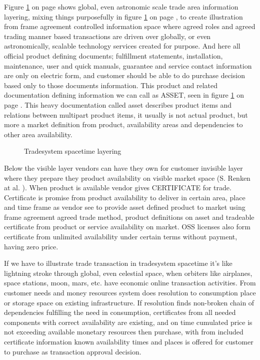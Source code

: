Figure \ref{fig:layering} on page \pageref{fig:layering} shows global, even
astronomic scale trade area information layering, mixing things purposefully
in figure \ref{fig:layering} on page \pageref{fig:layering}, to create
illustration from frame agreement controlled information space where agreed
roles and agreed trading manner based transactions are driven over globally,
or even astronomically, scalable technology services created for purpose. And
here all official product defining documents; fulfillment statements,
installation, maintenance, user and quick manuals, guarantee and service
contact information are only on electric form, and customer should be able to
do purchase decision based only to those documents information. This product
and related documentation defining information we can call as ASSET, seen in
figure \ref{fig:layering} on page \pageref{fig:layering}. This heavy
documentation called asset describes product items and relations between
multipart product items, it usually is not actual product, but more a market
definition from product, availability areas and dependencies to other area
availability.

\begin{figure} %
 \begin{center}
  \caption{Tradesystem spacetime layering}
  \label{fig:layering}
 \end{center}
\end{figure}

Below the visible layer vendors can have they own for customer invisible layer
where they prepare they product availability on visible market space (S.
Renken at al. \cite{RenkenNRWC2022}). When product is available vendor gives
CERTIFICATE for trade. Certificate is promise from product availability to
deliver in certain area, place and time frame as vendor see to provide asset
defined product to market using frame agreement agreed trade method, product
definitions on asset and tradeable certificate from product or service
availability on market. OSS licenses also form certificate from unlimited
availability under certain terms without payment, having zero price.

If we have to illustrate trade transaction in tradesystem spacetime it's like
lightning stroke through global, even celestial space, when orbiters like
airplanes, space stations, moon, mars, etc. have economic online transaction
activities. From customer needs and money resources system does resolution to
consumption place or storage space on existing infrastructure. If resolution
finds non-broken chain of dependencies fulfilling the need in consumption,
certificates from all needed components with correct availability are
existing, and on time cumulated price is not exceeding available monetary
resources then purchase, with from included certificate information known
availability times and places is offered for customer to purchase as
transaction approval decision.

